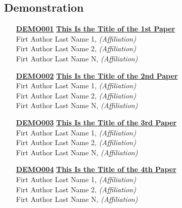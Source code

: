 \subsection{Demonstration}
\begin{enumerate}
\item[\href{https://doi.org/10.1145/1122445.1122456}{\textbf{DEMO001}}]
\href{https://doi.org/10.1145/1122445.1122456}{\textbf{This Is the Title of the 1st Paper}}\\
Firt Author Last Name 1, \emph{(Affiliation)}\\
Firt Author Last Name 2, \emph{(Affiliation)}\\
Firt Author Last Name N, \emph{(Affiliation)}\\

\item[\href{https://doi.org/10.1145/1122445.1122456}{\textbf{DEMO002}}]
\href{https://doi.org/10.1145/1122445.1122456}{\textbf{This Is the Title of the 2nd Paper}}\\
Firt Author Last Name 1, \emph{(Affiliation)}\\
Firt Author Last Name 2, \emph{(Affiliation)}\\
Firt Author Last Name N, \emph{(Affiliation)}\\

\item[\href{https://doi.org/10.1145/1122445.1122456}{\textbf{DEMO003}}]
\href{https://doi.org/10.1145/1122445.1122456}{\textbf{This Is the Title of the 3rd Paper}}\\
Firt Author Last Name 1, \emph{(Affiliation)}\\
Firt Author Last Name 2, \emph{(Affiliation)}\\
Firt Author Last Name N, \emph{(Affiliation)}\\

\item[\href{https://doi.org/10.1145/1122445.1122456}{\textbf{DEMO004}}]
\href{https://doi.org/10.1145/1122445.1122456}{\textbf{This Is the Title of the 4th Paper}}\\
Firt Author Last Name 1, \emph{(Affiliation)}\\
Firt Author Last Name 2, \emph{(Affiliation)}\\
Firt Author Last Name N, \emph{(Affiliation)}\\
\end{enumerate}


